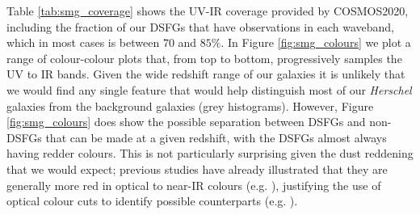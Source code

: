 Table \ref{tab:smg_coverage} shows the UV-IR coverage provided by COSMOS2020, including the fraction of our DSFGs that have observations in each waveband, which in most cases is between $70$ and $85\%$. In Figure \ref{fig:smg_colours} we plot a range of colour-colour plots that, from top to bottom, progressively samples the UV to IR bands. Given the wide redshift range of our galaxies it is unlikely that we would find any single feature that would help distinguish most of our \textit{Herschel} galaxies from the background galaxies (grey histograms). However, Figure \ref{fig:smg_colours} does show the possible separation between DSFGs and non-DSFGs that can be made at a given redshift, with the DSFGs almost always having redder colours. This is not particularly surprising given the dust reddening that we would expect; previous studies have already illustrated that they are generally more red in optical to near-IR colours (e.g. \citealt{Smail_2002, Dannerbauer_2004, Wang_2012, Chen_2016}), justifying the use of optical colour cuts to identify possible counterparts (e.g. \citealt{Michalowski_2012b}).

